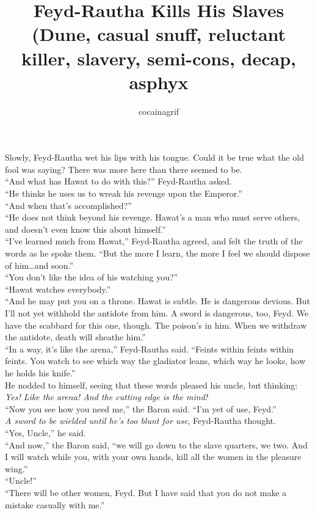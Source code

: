 \documentclass[12pt,letterpaper,draft]{memoir}
\author{cocainagrif}
\title{Feyd-Rautha Kills His Slaves (Dune, casual snuff, reluctant killer, slavery, semi-cons, decap, asphyx}
\begin{document}
\maketitle
Slowly, Feyd-Rautha wet his lips with his tongue. Could it be true what the old fool was saying? There was more here than there seemed to be.\\
“And what has Hawat to do with this?” Feyd-Rautha asked.\\
“He thinks he uses us to wreak his revenge upon the Emperor.”\\
“And when that’s accomplished?”\\
“He does not think beyond his revenge. Hawat’s a man who must serve others, and doesn’t even know this about himself.”\\
“I’ve learned much from Hawat,” Feyd-Rautha agreed, and felt the truth of the words as he spoke them. “But the more I learn, the more I feel we should dispose of him\ldots and  soon.”\\
“You don’t like the idea of his watching you?”\\
“Hawat watches everybody.”\\
“And he may put you on a throne. Hawat is subtle. He is dangerous 
devious. But I’ll not yet withhold the antidote from him. A sword is dangerous, too, Feyd. We have the scabbard for this one, though. The poison’s in him. When we withdraw the antidote, death will sheathe him.”\\
“In a way, it’s like the arena,” Feyd-Rautha said. “Feints within feints within feints. You watch to see which way the gladiator leans, which way he looks, how he holds his knife.”\\
He nodded to himself, seeing that these words pleased his uncle, but thinking: \textit{Yes! Like the arena! And the cutting edge is the mind!}\\
“Now you see how you need me,” the Baron said. “I’m yet of use, Feyd.”\\
\textit{A sword to be wielded until he’s too blunt for use}, Feyd-Rautha thought.\\
“Yes, Uncle,” he said.\\
“And now,” the Baron said, “we will go down to the slave quarters, we two. And I will watch while you, with your own hands, kill all the women in the pleasure wing.”\\
“Uncle!”\\
“There will be other women, Feyd. But I have said that you do not make a mistake casually with me.”\\
\end{document}
